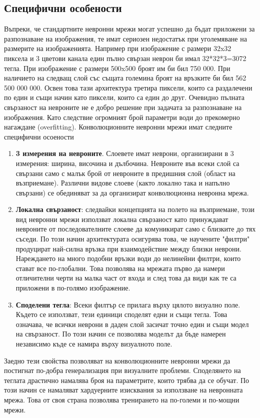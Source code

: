 \subsection{Специфични особености}
Въпреки, че стандартните невронни мрежи могат успешно да бъдат приложени за разпознаване на изображения, те имат сериозен недостатък при уголемяване на размерите на изображенията. Например при изображение с размери 32x32 пиксела и 3 цветови канала един пълно свързан неврон би имал 32*32*3=3072 тегла. При изображение с размери 500x500 броят им би бил 750 000. При наличието на следващ слой със същата големина броят на връзките би бил 562 500 000 000.
Освен това тази архитектура третира пиксели, които са раздалечени по един и същи начин като пиксели, които са един до друг. Очевидно пълната свързаност на невроните не е добро решение при задачата за разпознаване на изображения. Като следствие огромният брой параметри води до прекомерно нагаждане (overfitting). 
Конволюционните невронни мрежи имат следните специфични осоености
\begin{enumerate}
\item \textbf{3 измерения на невроните}. Слоевете имат неврони, организирани в 3 измерения: ширина, височина и дълбочина. Невроните във всеки слой са свързани само с малък брой от невроните в предишния слой (област на възприемане). Различни видове слоеве (както локално така и напълно свързани) се обединяват за да организират конволюционна невронна мрежа.
\item \textbf{Локална свързаност}: следвайки концепцията на полето на възприемане, този вид невронни мрежи използват локална свързаност като принуждават невроните от последователните слоеве да комуникират само с близките до тях съседи. По този начин архитектурата осигурява това, че научените "филтри" продуцират най-силна връзка при взаимодействие между близки неврони. Нареждането на много подобни връзки води до нелинейни филтри, които стават все по-глобални. Това позволява на мрежата първо да намери отличителни черти на малка част от входа и след това да види как те са приложени в по-голямо изображение.
\item \textbf{Споделени тегла}: Всеки филтър се прилага върху цялото визуално поле. Където се използват, тези единици споделят едни и същи тегла. Това означава, че всички неврони в даден слой засичат точно един и същи модел на свързаност. По този начин се позволява моделът да бъде намерен независимо къде се намира върху визуалното поле.
\end{enumerate}
Заедно тези свойства позволяват на конволюционните невронни мрежи да постигнат по-добра генерализация при визуалните проблеми. Споделянето на теглата драстично намалява броя на параметрите, които трябва да се обучат. По този начин се намаляват хардуерните изисквания за използване на невронната мрежа. Това от своя страна позволява тренирането на по-големи и по-мощни мрежи. 

